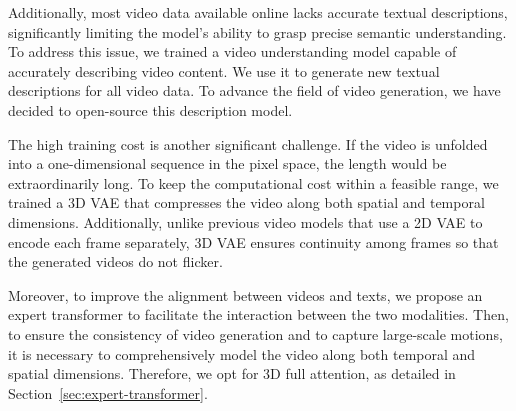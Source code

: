 {Additionally, most video data available online lacks accurate textual descriptions, significantly limiting the model's ability to grasp precise semantic understanding. To address this issue, we trained a video understanding model capable of accurately describing video content. We use it to generate new textual descriptions for all video data. 
To advance the field of video generation, we have decided to open-source this description model.

The high training cost is another significant challenge. If the video is unfolded into a one-dimensional sequence in the pixel space, the length would be extraordinarily long. To keep the computational cost within a feasible range, we trained a 3D VAE that compresses the video along both spatial and temporal dimensions. Additionally,  unlike previous video models that use a 2D VAE to encode each frame separately, 3D VAE ensures continuity among frames so that the generated videos do not flicker. 

Moreover, to improve the alignment between videos and texts, we propose an expert transformer to facilitate the interaction between the two modalities. Then, to ensure the consistency of video generation and to capture large-scale motions, it is necessary to comprehensively model the video along both temporal and spatial dimensions. Therefore, we opt for 3D full attention, as detailed in Section~\ref{sec:expert-transformer}.



}